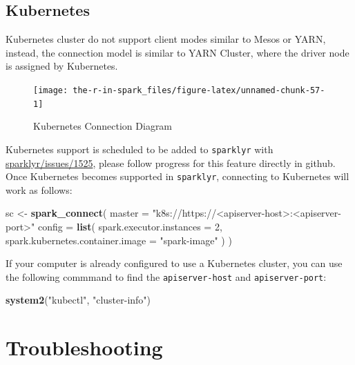 \documentclass[]{book}
\newenvironment{Shaded}{\begin{snugshade}}{\end{snugshade}}
\newcommand{\DataTypeTok}[1]{\textcolor[rgb]{0.13,0.29,0.53}{#1}}
\newcommand{\DecValTok}[1]{\textcolor[rgb]{0.00,0.00,0.81}{#1}}
\newcommand{\KeywordTok}[1]{\textcolor[rgb]{0.13,0.29,0.53}{\textbf{#1}}}
\newcommand{\NormalTok}[1]{#1}
\newcommand{\StringTok}[1]{\textcolor[rgb]{0.31,0.60,0.02}{#1}}
\theoremstyle{definition}
\theoremstyle{definition}
\theoremstyle{definition}
\theoremstyle{remark}
\begin{document}
\hypertarget{kubernetes-1}{%
\subsection{Kubernetes}\label{kubernetes-1}}

Kubernetes cluster do not support client modes similar to Mesos or YARN,
instead, the connection model is similar to YARN Cluster, where the
driver node is assigned by Kubernetes.

\begin{figure}

{\centering \texttt{[image: the-r-in-spark\_files/figure-latex/unnamed-chunk-57-1]} 

}

\caption{Kubernetes Connection Diagram}\label{fig:unnamed-chunk-57}
\end{figure}

Kubernetes support is scheduled to be added to \texttt{sparklyr} with
\href{https://github.com/rstudio/sparklyr/issues/1525}{sparklyr/issues/1525},
please follow progress for this feature directly in github. Once
Kubernetes becomes supported in \texttt{sparklyr}, connecting to
Kubernetes will work as follows:

\begin{Shaded}
\begin{Highlighting}[]
\NormalTok{sc <-}\StringTok{ }\KeywordTok{spark_connect}\NormalTok{(}
  \DataTypeTok{master =} \StringTok{"k8s://https://<apiserver-host>:<apiserver-port>"}
  \DataTypeTok{config =} \KeywordTok{list}\NormalTok{(}
    \DataTypeTok{spark.executor.instances =} \DecValTok{2}\NormalTok{,}
    \DataTypeTok{spark.kubernetes.container.image =} \StringTok{"spark-image"}
\NormalTok{  )}
\NormalTok{)}
\end{Highlighting}
\end{Shaded}

If your computer is already configured to use a Kubernetes cluster, you
can use the following commmand to find the \texttt{apiserver-host} and
\texttt{apiserver-port}:

\begin{Shaded}
\begin{Highlighting}[]
\KeywordTok{system2}\NormalTok{(}\StringTok{"kubectl"}\NormalTok{, }\StringTok{"cluster-info"}\NormalTok{)}
\end{Highlighting}
\end{Shaded}

\hypertarget{troubleshooting}{%
\section{Troubleshooting}\label{troubleshooting}}
\end{document}
